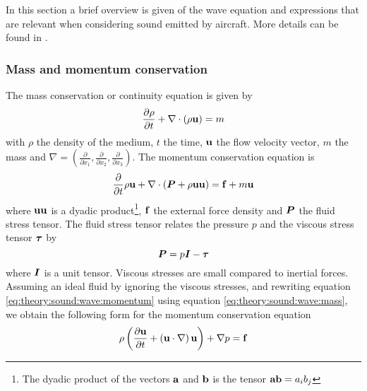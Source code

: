 In this section a brief overview is given of the wave equation and
expressions that are relevant when considering sound emitted by aircraft.
More details can be found in \cite{Rienstra2017}.

\subsubsection*{Mass and momentum conservation}
The mass conservation or continuity equation is given by
\begin{equation}\label{eq:theory:sound:wave:mass}
 \frac{\partial \rho}{\partial t} + \nabla \cdot \left( \rho \mathbf{u} \right) = m
\end{equation}
with $\rho$ the density of the medium, $t$ the time, $\mathbf{u}$ the flow velocity
vector, $m$ the mass and $\nabla = \left( \frac{\partial}{\partial
x_1},\frac{\partial}{\partial x_2},\frac{\partial}{\partial x_3} \right)$.
The momentum conservation equation is
\begin{equation}\label{eq:theory:sound:wave:momentum}
 \frac{\partial}{\partial t} \rho \mathbf{u} + \nabla \cdot \left(\bm{P} + \rho \mathbf{u} \mathbf{u}  \right) = \mathbf{f} + m \mathbf{u}
\end{equation}
where $\mathbf{u} \mathbf{u}$ is a dyadic product\footnote{The dyadic product of the
vectors $\mathbf{a}$ and $\mathbf{b}$ is the tensor $\mathbf{a}\mathbf{b}=a_i b_j$},
$\mathbf{f}$ the external force density and $\bm{P}$ the fluid stress tensor.
The fluid stress tensor relates the pressure $p$ and the viscous stress tensor
$\bm{\tau}$ by
\begin{equation}
  \bm{P} = p \bm{I} - \bm{\tau}
\end{equation}
where $\bm{I}$ is a unit tensor. Viscous stresses are small compared to inertial
forces. Assuming an ideal fluid by ignoring the viscous stresses, and rewriting equation
\eqref{eq:theory:sound:wave:momentum} using equation
\eqref{eq:theory:sound:wave:mass}, we obtain the following form for the momentum conservation equation
\begin{equation}
 \rho \left( \frac{\partial \mathbf{u}}{\partial t} + \left( \mathbf{u} \cdot \nabla \right) \mathbf{u} \right) + \nabla p = \mathbf{f}
\end{equation}

